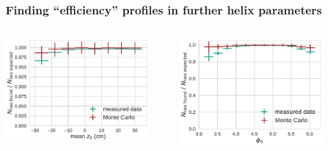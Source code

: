 \documentclass[18pt, aspectratio=169]{beamer}
\begin{document}
\begin{frame}
  \frametitle{Finding ``efficiency'' profiles in further helix parameters}
  \begin{columns}
    \begin{column}{0.33\textwidth}
      \centering
      \includegraphics[width=0.9\textwidth]{figures/efficiency_study/cosmicbased_findeff_over_z0.pdf}\\
    \end{column}
    \begin{column}{0.33\textwidth}
      \centering
      \includegraphics[width=0.9\textwidth]{figures/efficiency_study/cosmicbased_findeff_over_phi0.pdf}\\
    \end{column}
    \begin{column}{0.33\textwidth}
      \centering

\end{column}
\end{columns}
\end{frame}
\end{document}
